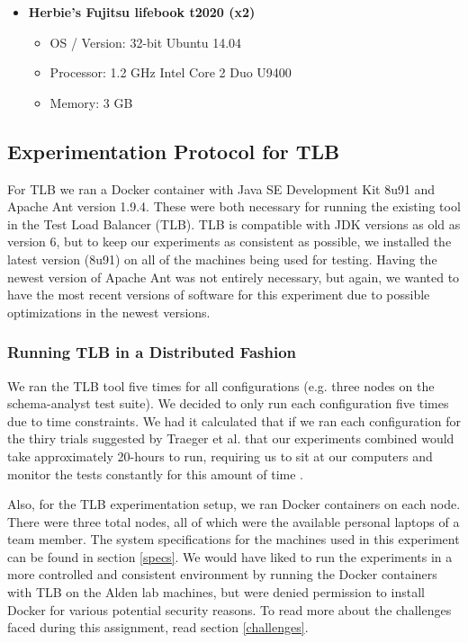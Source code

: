 \documentclass{article}
\begin{document}
{\begin{itemize}
\item \textbf{Herbie's Fujitsu lifebook t2020 (x2)}
\begin{itemize}
    \item OS / Version: 32-bit Ubuntu 14.04
    \item Processor: 1.2 GHz Intel Core 2 Duo U9400
    \item Memory: 3 GB
\end{itemize}
\end{itemize}

\subsection{Experimentation Protocol for TLB}
For TLB we ran a Docker container with Java SE Development Kit 8u91 and Apache Ant version 1.9.4. These were both necessary
for running the existing tool in the Test Load Balancer (TLB). TLB is compatible with JDK versions as old as version 6, but
to keep our experiments as consistent as possible, we installed the latest version (8u91) on all of the machines being used for
testing. Having the newest version of Apache Ant was not entirely necessary, but again, we wanted to have the most
recent versions of software for this experiment due to possible optimizations in the newest versions.

\subsubsection{Running TLB in a Distributed Fashion}
We ran the TLB tool five times for all configurations (e.g. three nodes on the schema-analyst test suite). We decided
to only run each configuration five times due to time constraints. We had it calculated that if we ran each configuration
for the thiry trials suggested by Traeger et al. that our experiments combined would take approximately 20-hours
to run, requiring us to sit at our computers and monitor the tests constantly for this amount of time \cite{traeger2008nine}.

Also, for the TLB experimentation setup, we ran Docker containers on each node. There were three total nodes, all of which
were the available personal laptops of a team member. The system specifications for the machines used in this experiment
can be found in section \ref{specs}. We would have liked to run the experiments in a more controlled and consistent environment
by running the Docker containers with TLB on the Alden lab machines, but were denied permission to install Docker for various
potential security reasons. To read more about the challenges faced during this assignment, read section \ref{challenges}.

}
\end{document}
